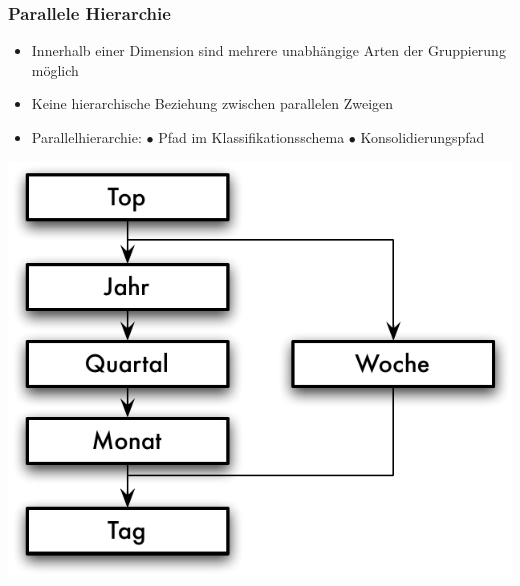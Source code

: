         \begin{frame}

        \frametitle{Parallele Hierarchie}

        \begin{itemize}
        \item Innerhalb einer Dimension sind mehrere unabhängige Arten der
          Gruppierung möglich
        \item Keine hierarchische Beziehung zwischen parallelen Zweigen
        \item Parallelhierarchie: $\bullet$ Pfad im Klassifikationsschema $\bullet$ Konsolidierungspfad

        \end{itemize}

        \begin{center}
        \includegraphics[height=0.46\textAreaHeight]{fig6/Parallele-Hierarchien.pdf}
        \end{center}

        \end{frame}



